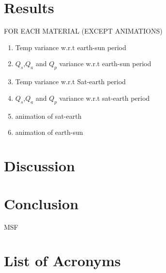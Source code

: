 \documentclass[11pt]{article}
\begin{document}
\newpage
\section{Results} %
\indent
FOR EACH MATERIAL (EXCEPT ANIMATIONS)
\begin{enumerate}
    \item Temp variance w.r.t earth-sun period
    \item $Q_{s}$,$Q_{a}$ and $Q_{p}$ variance w.r.t earth-sun period
    \item Temp variance w.r.t Sat-earth period
    \item $Q_{s}$,$Q_{a}$ and $Q_{p}$ variance w.r.t sat-earth period
    \item animation of sat-earth
    \item animation of earth-sun 


\end{enumerate}


\newpage
\section{Discussion} %
\indent

\newpage
\section{Conclusion} MSF
\indent

 
\section{List of Acronyms}
\begin{acronym}
\end{acronym}




\end{document}
